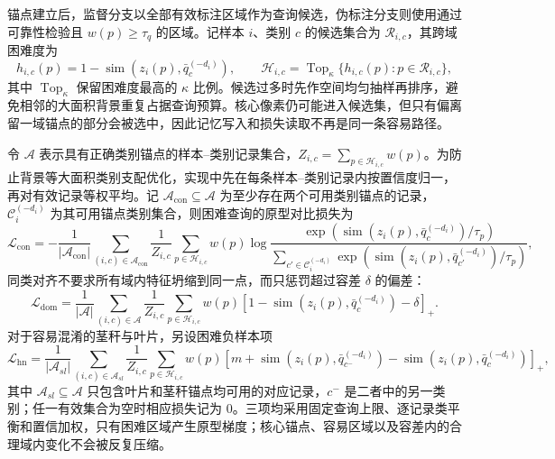 锚点建立后，监督分支以全部有效标注区域作为查询候选，伪标注分支则使用通过 \TRPL 可靠性检验且 $w(p)\geq\tau_q$ 的区域。记样本 $i$、类别 $c$ 的候选集合为 $\mathcal R_{i,c}$，其跨域困难度为
\begin{equation}
h_{i,c}(p)=1-\operatorname{sim}\left(z_i(p),\bar q_c^{(-d_i)}\right),\qquad
\mathcal H_{i,c}=\operatorname{Top}_{\kappa}\{h_{i,c}(p):p\in\mathcal R_{i,c}\},
\label{eq:hardquery}
\end{equation}
其中 $\operatorname{Top}_{\kappa}$ 保留困难度最高的 $\kappa$ 比例。候选过多时先作空间均匀抽样再排序，避免相邻的大面积背景重复占据查询预算。核心像素仍可能进入候选集，但只有偏离留一域锚点的部分会被选中，因此记忆写入和损失读取不再是同一条容易路径。

令 $\mathcal A$ 表示具有正确类别锚点的样本--类别记录集合，$Z_{i,c}=\sum_{p\in\mathcal H_{i,c}}w(p)$。为防止背景等大面积类别支配优化，实现中先在每条样本--类别记录内按置信度归一，再对有效记录等权平均。记 $\mathcal A_{\mathrm{con}}\subseteq\mathcal A$ 为至少存在两个可用类别锚点的记录，$\mathcal C_i^{(-d_i)}$ 为其可用锚点类别集合，则困难查询的原型对比损失为
\begin{equation}
\mathcal L_{\mathrm{con}}=
-\frac{1}{|\mathcal A_{\mathrm{con}}|}
\sum_{(i,c)\in\mathcal A_{\mathrm{con}}}\frac{1}{Z_{i,c}}
\sum_{p\in\mathcal H_{i,c}}w(p)
\log\frac{\exp(\operatorname{sim}(z_i(p),\bar q_c^{(-d_i)})/\tau_p)}
{\sum_{c'\in\mathcal C_i^{(-d_i)}}\exp(\operatorname{sim}(z_i(p),\bar q_{c'}^{(-d_i)})/\tau_p)},
\label{eq:contrastive}
\end{equation}
同类对齐不要求所有域内特征坍缩到同一点，而只惩罚超过容差 $\delta$ 的偏差：
\begin{equation}
\mathcal L_{\mathrm{dom}}=
\frac{1}{|\mathcal A|}\sum_{(i,c)\in\mathcal A}\frac{1}{Z_{i,c}}
\sum_{p\in\mathcal H_{i,c}}w(p)
\left[1-\operatorname{sim}(z_i(p),\bar q_c^{(-d_i)})-\delta\right]_+.
\label{eq:domaincompact}
\end{equation}
对于容易混淆的茎秆与叶片，另设困难负样本项
\begin{equation}
\mathcal L_{\mathrm{hn}}=
\frac{1}{|\mathcal A_{sl}|}\sum_{(i,c)\in\mathcal A_{sl}}\frac{1}{Z_{i,c}}
\sum_{p\in\mathcal H_{i,c}}w(p)
\left[m+\operatorname{sim}(z_i(p),\bar q_{c^-}^{(-d_i)})
-\operatorname{sim}(z_i(p),\bar q_c^{(-d_i)})\right]_+,
\label{eq:hardnegative}
\end{equation}
其中 $\mathcal A_{sl}\subseteq\mathcal A$ 只包含叶片和茎秆锚点均可用的对应记录，$c^-$ 是二者中的另一类别；任一有效集合为空时相应损失记为 0。三项均采用固定查询上限、逐记录类平衡和置信加权，只有困难区域产生原型梯度；核心锚点、容易区域以及容差内的合理域内变化不会被反复压缩。

